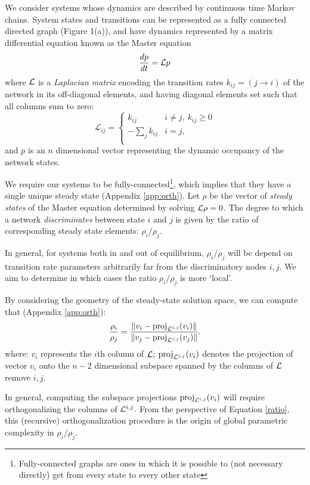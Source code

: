 We consider systems whose dynamics are described by continuous time Markov chains.  System states and transitions can be represented as a fully connected directed graph (Figure 1(a)), and have dynamics represented by a matrix differential equation known as the Master equation
\[
\frac{d{p}}{dt} = \mathcal{L}{p}
\]
where $\mathcal{L}$ is a {\it Laplacian matrix} encoding the transition rates $k_{ij} = (j\to i)$ of the network in its off-diagonal elements, and having diagonal elements set such that all columns sum to zero:
\[
\mathcal{L}_{ij} =
 \begin{cases}
       {k_{ij}} & i\neq j, \ k_{ij}\ge0\\
       {-\sum_j k_{ij}} & i=j,\\
\end{cases}
\]
and ${p}$ is an $n$ dimensional vector representing the dynamic occupancy of the network states.

We require our systems to be fully-connected\footnote{Fully-connected graphs are ones in which it is possible to (not necessary directly) get from every state to every other state}, which implies that they have a single unique steady state (Appendix \ref{app:orth}).  Let $\rho$ be the vector of {\it steady states} of the Master equation determined by solving $\mathcal{L} \rho=0$.  The degree to which a network {\it discriminates} between state $i$ and $j$ is given by the ratio of corresponding steady state elements: $\rho_i/\rho_j.$

In general, for systems both in and out of equilibrium, $\rho_i/\rho_j$ will be depend on transition rate parameters arbitrarily far from the discriminatory nodes $i, j.$  We aim to determine in which cases the ratio $\rho_i/\rho_j$ is more `local'.

By considering the geometry of the steady-state solution space, we can compute that (Appendix \ref{app:orth}):
\begin{equation}\label{ratio}
\frac{\rho_i}{\rho_j} = \frac{\left\lVert v_i - {\rm proj}_{\mathcal{L}^{i,j}}(v_i)\right\rVert}{\left\lVert v_j - {\rm proj}_{\mathcal{L}^{i,j}}(v_j)\right\rVert}.
\end{equation}
where: $v_i$ represents the $i$th column of $\mathcal{L};$ ${\rm proj}_{\mathcal{L}^{i,j}}(v_i)$ denotes the projection of vector $v_i$ onto the $n-2$ dimensional subspace spanned by the columns of $\mathcal{L}$ remove $i,j.$

In general, computing the subspace projections ${\rm proj}_{\mathcal{L}^{i,j}}(v_i)$ will require orthogonalizing the columns of ${\mathcal{L}^{i,j}}.$ From the perspective of Equation \ref{ratio}, this (recursive) orthogonalization procedure is the origin of global parametric complexity in $\rho_i/\rho_j$.

